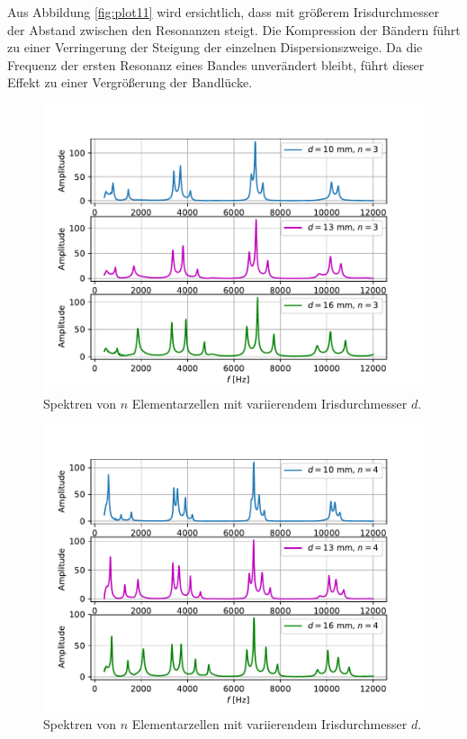 Aus Abbildung \ref{fig:plot11} wird ersichtlich, dass mit größerem Irisdurchmesser der Abstand zwischen den Resonanzen steigt. Die Kompression der Bändern
führt zu einer Verringerung der Steigung der einzelnen Dispersionszweige. Da die Frequenz der ersten Resonanz eines Bandes unverändert bleibt,
führt dieser Effekt zu einer Vergrößerung der Bandlücke.
\begin{figure}
  \centering
  \includegraphics[scale=0.5]{Messwerte/plot12.pdf}
  \caption{Spektren von $n$ Elementarzellen mit variierendem Irisdurchmesser $d$.}
  \label{fig:plot12}
\end{figure}
\begin{figure}
  \centering
  \includegraphics[scale=0.5]{Messwerte/plot13.pdf}
  \caption{Spektren von $n$ Elementarzellen mit variierendem Irisdurchmesser $d$.}
  \label{fig:plot13}
\end{figure}
